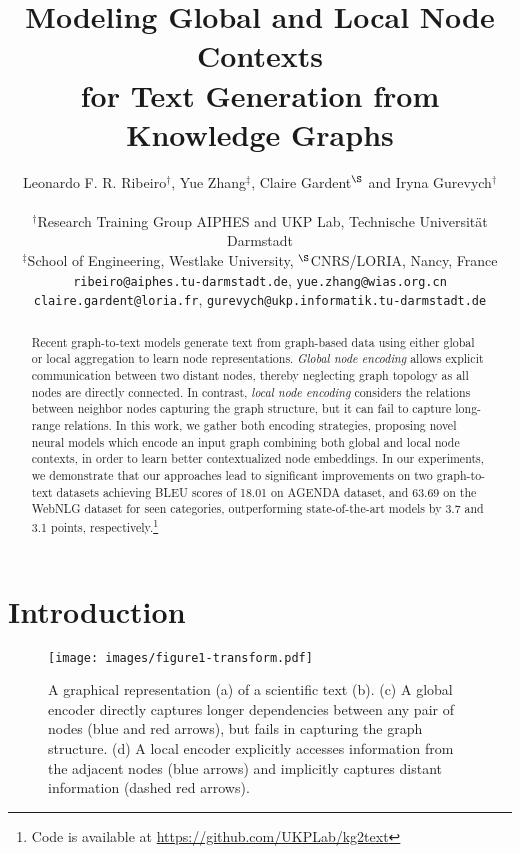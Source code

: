 \documentclass[11pt,a4paper]{article}
\title{Modeling Global and Local Node Contexts \\ for Text Generation from Knowledge Graphs}
\author{Leonardo F. R. Ribeiro$^{\dag}$, Yue Zhang$^{\ddag}$, Claire Gardent$^{\S}$ and Iryna Gurevych$^{\dag}$ \vspace{1mm} \\
\rule{0pt}{2.5ex}
  $^{\dag}$Research Training Group AIPHES and UKP Lab, Technische Universit\"at Darmstadt\\
  $^{\ddag}$School of Engineering, Westlake University, $^{\S}$CNRS/LORIA, Nancy, France \\
 \texttt{ribeiro@aiphes.tu-darmstadt.de}, \texttt{yue.zhang@wias.org.cn} \\
 \texttt{claire.gardent@loria.fr}, \texttt{gurevych@ukp.informatik.tu-darmstadt.de}
}
\date{}
\begin{document}
\maketitle
\begin{abstract}
  Recent graph-to-text models generate text from graph-based data using either global or local aggregation to learn node representations. \emph{Global node encoding} allows explicit communication between two distant nodes, thereby neglecting graph topology as all nodes are directly connected. In contrast, \emph{local node encoding} considers the relations between neighbor nodes capturing the graph structure, but it can fail to capture long-range relations. In this work, we gather both encoding strategies, proposing novel neural models which encode an input graph combining both global and local node contexts, in order to learn better contextualized node embeddings. In our experiments, we demonstrate that our approaches lead to significant improvements on two graph-to-text datasets achieving BLEU scores of 18.01 on AGENDA dataset, and 63.69 on the WebNLG dataset for seen categories, outperforming state-of-the-art models by 3.7 and 3.1 points, respectively.\footnote{Code is available at \href{https://github.com/UKPLab/kg2text}{https://github.com/UKPLab/kg2text}}
  


  
\end{abstract}

\section{Introduction}










\begin{figure}[t]
    \centering
    \texttt{[image: images/figure1-transform.pdf]}
    \caption{A graphical representation (a) of a scientific text (b). (c) A global encoder directly captures longer dependencies between any pair of nodes (blue and red arrows), but fails in capturing the graph structure. (d) A local encoder explicitly accesses information from the adjacent nodes (blue arrows) and implicitly captures distant information (dashed red arrows). }
    \label{fig:kg}
\end{figure}
\end{document}
